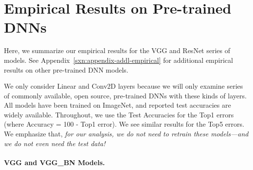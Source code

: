 \vspace{-3mm}

\section{Empirical Results on Pre-trained DNNs}
\label{sxn:emp}

\vspace{-2mm}

Here, we summarize our empirical results for the VGG and ResNet series of models.
See Appendix~\ref{sxn:appendix-addl-empirical} for additional empirical results on other pre-trained DNN models.

We only consider Linear and Conv2D layers because we will only examine series of commonly available, open source, pre-trained DNNs with these kinds of layers. 
All models have been trained on ImageNet, and reported test accuracies are widely available. 
Throughout, we use the Test Accuracies for the Top1 errors (where Accuracy = 100 - Top1 error).
We see similar results for the Top5 errors.
We emphasize that, \emph{for our analysis, we do not need to retrain these models---and we do not even need the test data!}

\paragraph{VGG and VGG\_BN Models.}

